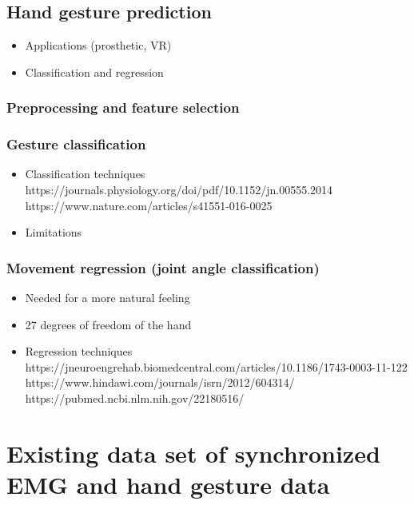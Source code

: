 \documentclass{article}
\begin{document}
\subsection{Hand gesture prediction}

\begin{itemize}
    \item Applications (prosthetic, VR)
    \item Classification and regression
\end{itemize}

\subsubsection{Preprocessing and feature selection}

\subsubsection{Gesture classification}

\begin{itemize}
    \item Classification techniques \\
    https://journals.physiology.org/doi/pdf/10.1152/jn.00555.2014 \\
    https://www.nature.com/articles/s41551-016-0025
    \item Limitations
\end{itemize}


\subsubsection{Movement regression (joint angle classification)}

\begin{itemize}
    \item Needed for a more natural feeling
    \item 27 degrees of freedom of the hand
    \item Regression techniques \\
    https://jneuroengrehab.biomedcentral.com/articles/10.1186/1743-0003-11-122 \\
    https://www.hindawi.com/journals/isrn/2012/604314/ \\
    https://pubmed.ncbi.nlm.nih.gov/22180516/
\end{itemize}





\section{Existing data set of synchronized EMG and hand gesture data}
\end{document}
